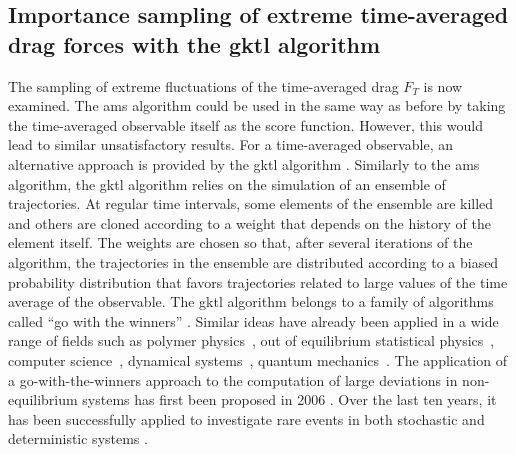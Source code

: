 \documentclass{jfm}
\begin{document}
\subsection{Importance sampling of extreme time-averaged drag forces with the \acl{gktl} algorithm}
\label{sec:gktl}
The sampling of extreme fluctuations of the time-averaged drag $F_T$ is now examined.
The \ac{ams} algorithm could be used in the same way as before
by taking the time-averaged observable itself as the score function.
However, this would lead to similar unsatisfactory results.
%
For a time-averaged observable, an alternative approach is provided by the \acf{gktl} algorithm \citep{giardina_direct_2006,tailleur_probing_2007,giardina_simulating_2011}.
%
Similarly to the \ac{ams} algorithm, the \ac{gktl} algorithm relies on the simulation of an ensemble of trajectories.
%
At regular time intervals, some elements of the ensemble are killed and others are cloned according to a weight that depends on the history of the element itself.
%
The weights are chosen so that, after several iterations of the algorithm, the trajectories in the ensemble are distributed according to a biased probability distribution that favors trajectories related to large values of the time average of the observable.
%
The \ac{gktl} algorithm belongs to a family of algorithms called ``go with the winners'' \citep{aldous1994go,grassberger2002go}.
{Similar ideas have already been applied in a wide range of fields such as polymer physics~\citep{grassberger1998perm}, out of equilibrium statistical physics~\citep{PhysRevLett.118.115702}, computer science~\citep{aldous1994go}, dynamical systems~\citep{tailleur_probing_2007}, quantum mechanics~\citep{intro_DMC_kosztin}.}
The application of a go-with-the-winners approach to the computation of large deviations in non-equilibrium systems has first been proposed in 2006 \citep{giardina_direct_2006}.
Over the last ten years, it has been successfully applied to investigate rare events in both stochastic \citep{giardina_direct_2006,lecomte_numerical_2007,garrahan2007dynamical} and deterministic systems \citep{giardina_direct_2006,tailleur_probing_2007}.
\end{document}
